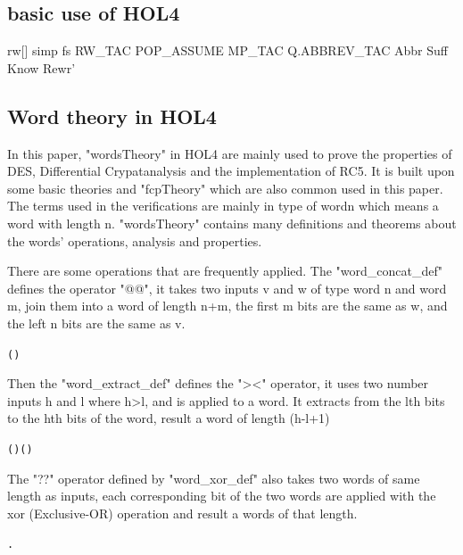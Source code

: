 \documentclass{article}
\begin{document}
\subsection{basic use of HOL4}
rw[] simp fs
RW_TAC
POP_ASSUME MP_TAC
Q.ABBREV_TAC Abbr
Suff Know Rewr'

\subsection{Word theory in HOL4}
In this paper, "wordsTheory" in HOL4 are mainly used to prove the properties of DES, Differential Crypatanalysis
and the implementation of RC5. It is built upon some basic theories and "fcpTheory" which are also common used in
this paper. The terms used in the verifications are mainly in type of wordn which means a word with length n.
"wordsTheory" contains many definitions and theorems about the words' operations, analysis and properties.

There are some operations that are frequently applied. The "word_concat_def" defines the operator "@@", it takes two
inputs v and w of type word n and word m, join them into a word of length n+m, the first m bits are the same as w,
and the left n bits are the same as v.
\begin{alltt}
   \HOLTokenTurnstile{}    \HOLSymConst{=}  (  )
\end{alltt}

Then the "word_extract_def" defines the "><" operator, it uses two number inputs h and l where h>l, and is applied
to a word. It extracts from the lth bits to the hth bits of the word, result a word of length (h-l+1)
\begin{alltt}
   \HOLTokenTurnstile{} ( \HOLSymConst{\HOLTokenExtract{}} ) \HOLSymConst{=}  \HOLSymConst{\HOLTokenCompose} ( \HOLSymConst{--} )
\end{alltt}

The "??" operator defined by "word_xor_def" also takes two words of same length as inputs,
each corresponding bit of the two words are applied with the xor (Exclusive-OR) operation
and result a words of that length.
\begin{alltt}
   \HOLTokenTurnstile{}  \HOLSymConst{\HOLTokenEor{}}  \HOLSymConst{=}  .    \HOLSymConst{\HOLTokenNotEquiv{}}   
\end{alltt}
\end{document}
